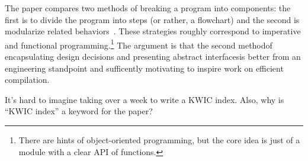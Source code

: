 \documentclass{article}
\begin{document}

The paper compares two methods of breaking a program into components:
 the first is to divide the program into steps (or rather, a flowchart)
 and the second is modularize related behaviors~\cite{p-criteria}.
These strategies roughly correspond to imperative and functional programming.\footnote{There are hints of object-oriented programming, but the core idea is just of a module with a clear API of functions.}
The argument is that the second method\textemdash of encapsulating design decisions and presenting abstract interfaces\textemdash is better from an engineering standpoint and sufficently motivating to inspire work on efficient compilation.



It's hard to imagine taking over a week to write a KWIC index.
Also, why is ``KWIC index'' a keyword for the paper?

\footnotesize


\end{document}
